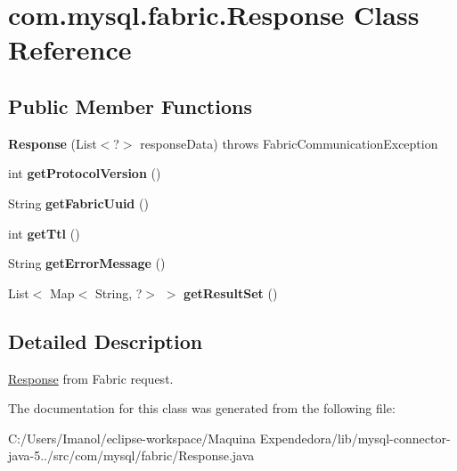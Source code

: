 \hypertarget{classcom_1_1mysql_1_1fabric_1_1_response}{}\section{com.\+mysql.\+fabric.\+Response Class Reference}
\label{classcom_1_1mysql_1_1fabric_1_1_response}
\subsection*{Public Member Functions}
\begin{DoxyCompactItemize}
\item 
\mbox{\label{classcom_1_1mysql_1_1fabric_1_1_response_a9915003da8b71deb77e32b1cc551132a}} 
{\bfseries Response} (List$<$?$>$ response\+Data)  throws Fabric\+Communication\+Exception 
\item 
\mbox{\label{classcom_1_1mysql_1_1fabric_1_1_response_aefbce51460008ea2740919797c1c7b5c}} 
int {\bfseries get\+Protocol\+Version} ()
\item 
\mbox{\label{classcom_1_1mysql_1_1fabric_1_1_response_a4ed075787ade09ad033f4c96e0bd4338}} 
String {\bfseries get\+Fabric\+Uuid} ()
\item 
\mbox{\label{classcom_1_1mysql_1_1fabric_1_1_response_a7afb25a51a2f5752a62b02883b2888f7}} 
int {\bfseries get\+Ttl} ()
\item 
\mbox{\label{classcom_1_1mysql_1_1fabric_1_1_response_a5fb3ba73f94ff3e42217ec2158d1a181}} 
String {\bfseries get\+Error\+Message} ()
\item 
\mbox{\label{classcom_1_1mysql_1_1fabric_1_1_response_af79e46fd764b7dece6fddf5731a41a1e}} 
List$<$ Map$<$ String, ?$>$ $>$ {\bfseries get\+Result\+Set} ()
\end{DoxyCompactItemize}


\subsection{Detailed Description}
\mbox{\hyperlink{classcom_1_1mysql_1_1fabric_1_1_response}{Response}} from Fabric request. 

The documentation for this class was generated from the following file\+:\begin{DoxyCompactItemize}
\item 
C\+:/\+Users/\+Imanol/eclipse-\/workspace/\+Maquina Expendedora/lib/mysql-\/connector-\/java-\/5../src/com/mysql/fabric/Response.\+java\end{DoxyCompactItemize}
